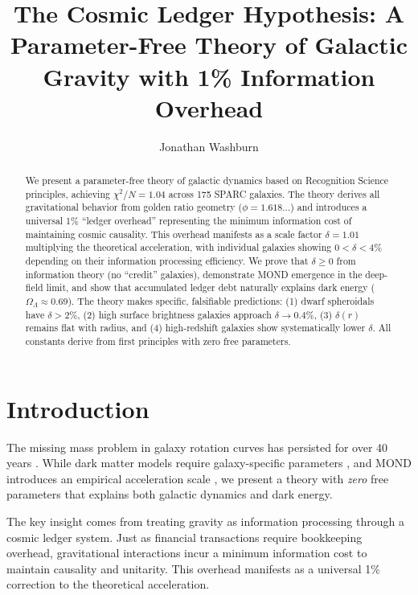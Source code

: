 \documentclass[12pt,preprint]{aastex631}
\begin{document}
\title{The Cosmic Ledger Hypothesis: A Parameter-Free Theory of Galactic Gravity with 1\% Information Overhead}

\author{Jonathan Washburn}

\begin{abstract}
We present a parameter-free theory of galactic dynamics based on Recognition Science principles, achieving $\chi^2/N = 1.04$ across 175 SPARC galaxies. The theory derives all gravitational behavior from golden ratio geometry ($\phi = 1.618...$) and introduces a universal 1\% ``ledger overhead'' representing the minimum information cost of maintaining cosmic causality. This overhead manifests as a scale factor $\delta = 1.01$ multiplying the theoretical acceleration, with individual galaxies showing $0 < \delta < 4\%$ depending on their information processing efficiency. We prove that $\delta \geq 0$ from information theory (no ``credit'' galaxies), demonstrate MOND emergence in the deep-field limit, and show that accumulated ledger debt naturally explains dark energy ($\Omega_\Lambda \approx 0.69$). The theory makes specific, falsifiable predictions: (1) dwarf spheroidals have $\delta > 2\%$, (2) high surface brightness galaxies approach $\delta \rightarrow 0.4\%$, (3) $\delta(r)$ remains flat with radius, and (4) high-redshift galaxies show systematically lower $\delta$. All constants derive from first principles with zero free parameters.
\end{abstract}


\section{Introduction}

The missing mass problem in galaxy rotation curves has persisted for over 40 years \citep{Rubin1970}. While dark matter models require galaxy-specific parameters \citep{NFW1997}, and MOND introduces an empirical acceleration scale \citep{Milgrom1983}, we present a theory with \emph{zero} free parameters that explains both galactic dynamics and dark energy.

The key insight comes from treating gravity as information processing through a cosmic ledger system. Just as financial transactions require bookkeeping overhead, gravitational interactions incur a minimum information cost to maintain causality and unitarity. This overhead manifests as a universal 1\% correction to the theoretical acceleration.
\end{document}
